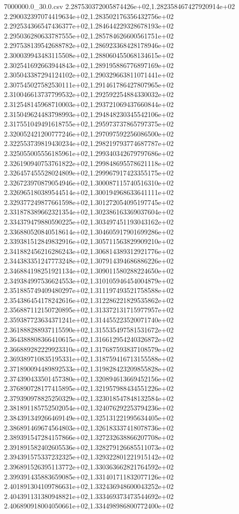 \begin{filecontents*}{7000000.0_30.0.csv}
2.287530372005874426e+02,1.282358467427920914e+02
2.290032397074419634e+02,1.283502176356432756e+02
2.292534366547436377e+02,1.284644229328678193e+02
2.295036280633787555e+02,1.285784626600561751e+02
2.297538139542688782e+02,1.286923368428178946e+02
2.300039943483115508e+02,1.288060455068134615e+02
2.302541692663944843e+02,1.289195886776897169e+02
2.305043387294124102e+02,1.290329663811071441e+02
2.307545027582530111e+02,1.291461786427807965e+02
2.310046613737799532e+02,1.292592254884330032e+02
2.312548145968710003e+02,1.293721069437660844e+02
2.315049624483798993e+02,1.294848230345542106e+02
2.317551049491618755e+02,1.295973737865797375e+02
2.320052421200777246e+02,1.297097592256086500e+02
2.322553739819430234e+02,1.298219793774687787e+02
2.325055005556185961e+02,1.299340342679797686e+02
2.326190940753761822e+02,1.299848695578621118e+02
2.326457455528024809e+02,1.299967917423355175e+02
2.326723970879054946e+02,1.300087115740516310e+02
2.326965180389544514e+02,1.300194968633641111e+02
2.329377249877661598e+02,1.301272054095197745e+02
2.331878389662321354e+02,1.302386163369037604e+02
2.334379479880590225e+02,1.303497451193043162e+02
2.336880520840518614e+02,1.304605917901699286e+02
2.339381512849832916e+02,1.305711563829909210e+02
2.341882456216286243e+02,1.306814389312921776e+02
2.344383351247773248e+02,1.307914394686886226e+02
2.346884198251921134e+02,1.309011580288224650e+02
2.349384997536624553e+02,1.310105946454004879e+02
2.351885749409480297e+02,1.311197493521758588e+02
2.354386454178242616e+02,1.312286221829535862e+02
2.356887112150720895e+02,1.313372131715977957e+02
2.359387723634371241e+02,1.314455223520071740e+02
2.361888288937115590e+02,1.315535497581531672e+02
2.364388808366410615e+02,1.316612954240326872e+02
2.366889282229923310e+02,1.317687593837108579e+02
2.369389710835195331e+02,1.318759416713155588e+02
2.371890094489892533e+02,1.319828423209855828e+02
2.374390433501457380e+02,1.320894613669452156e+02
2.376890728177415895e+02,1.321957988434551226e+02
2.379390978825250329e+02,1.323018547848132584e+02
2.381891185752502054e+02,1.324076292253794236e+02
2.384391349266469149e+02,1.325131221995634405e+02
2.386891469674564803e+02,1.326183337418078736e+02
2.389391547284157866e+02,1.327232638866207708e+02
2.391891582402605536e+02,1.328279126685511073e+02
2.394391575337232325e+02,1.329322801221915142e+02
2.396891526395113772e+02,1.330363662821764592e+02
2.399391435883659085e+02,1.331401711832077126e+02
2.401891304109786631e+02,1.332436948600043252e+02
2.404391131380948821e+02,1.333469373473544692e+02
2.406890918004050661e+02,1.334498986800772400e+02

\end{filecontents*}
